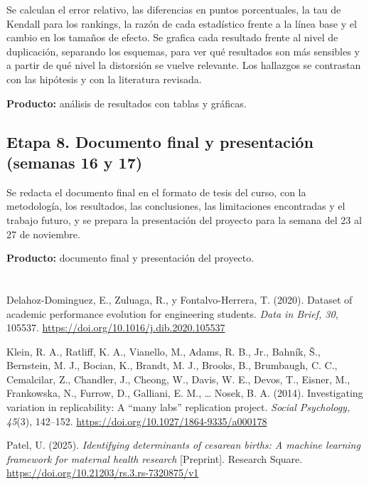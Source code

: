 \documentclass[11pt,openany,oneside,letterpaper]{book}
\makeatletter
\newcommand{\seccioncorta}[2]{{\renewcommand{\sectionmark}[1]{}\section{#2}}\markright{\MakeUppercase{\thesection.\ #1}}}
\renewenvironment{thebibliography}[1]
  {\chapter*{\bibname}\addcontentsline{toc}{chapter}{\bibname}%
   \def\@biblabel##1{}\list{}{\usecounter{enumiv}\setlength{\leftmargin}{1.27cm}\setlength{\itemindent}{-1.27cm}%
   \setlength{\itemsep}{4pt}\setlength{\parsep}{0pt}}\sloppy}
  {\endlist}
\makeatother
\begin{document}
Se calculan el error relativo, las diferencias en puntos porcentuales, la tau de Kendall para los rankings, la razón de cada estadístico frente a la línea base y el cambio en los tamaños de efecto. Se grafica cada resultado frente al nivel de duplicación, separando los esquemas, para ver qué resultados son más sensibles y a partir de qué nivel la distorsión se vuelve relevante. Los hallazgos se contrastan con las hipótesis y con la literatura revisada.

\textbf{Producto:} análisis de resultados con tablas y gráficas.

\seccioncorta{Etapa 8}{Etapa 8. Documento final y presentación (semanas 16 y 17)}

Se redacta el documento final en el formato de tesis del curso, con la metodología, los resultados, las conclusiones, las limitaciones encontradas y el trabajo futuro, y se prepara la presentación del proyecto para la semana del 23 al 27 de noviembre.

\textbf{Producto:} documento final y presentación del proyecto.

 \backmatter

\begin{thebibliography}{xx}

 Delahoz-Dominguez, E., Zuluaga, R., y Fontalvo-Herrera, T. (2020). Dataset of academic performance evolution for engineering students. \emph{Data in Brief, 30}, 105537. \url{https://doi.org/10.1016/j.dib.2020.105537}

 Klein, R. A., Ratliff, K. A., Vianello, M., Adams, R. B., Jr., Bahník, Š., Bernstein, M. J., Bocian, K., Brandt, M. J., Brooks, B., Brumbaugh, C. C., Cemalcilar, Z., Chandler, J., Cheong, W., Davis, W. E., Devos, T., Eisner, M., Frankowska, N., Furrow, D., Galliani, E. M., \ldots{} Nosek, B. A. (2014). Investigating variation in replicability: A ``many labs'' replication project. \emph{Social Psychology, 45}(3), 142--152. \url{https://doi.org/10.1027/1864-9335/a000178}

 Patel, U. (2025). \emph{Identifying determinants of cesarean births: A machine learning framework for maternal health research} [Preprint]. Research Square. \url{https://doi.org/10.21203/rs.3.rs-7320875/v1}
\end{thebibliography}
\end{document}
